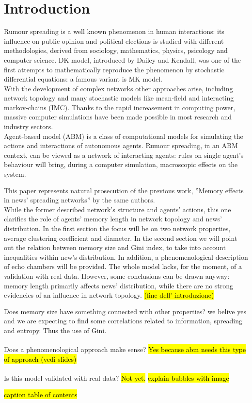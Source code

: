 \section{Introduction} \label{introduction}
Rumour spreading is a well known phenomenon in human interactions:
its influence on public opinion\cite{publicoprumsp} and political
elections\cite{politicalrumsp} is studied with different
methodologies, derived from sociology, mathematics,
physics, psicology and computer science.
DK model,\cite{DKmodel} introduced by Dailey and Kendall, was one of
the first attempts to mathematically reproduce the phenomenon by
stochastic differential equations: a famous variant is MK
model.\cite{MKmodel}\\
With the development of complex networks other approaches arise,
including network topology and many stochastic models
like mean-field\cite{meanfield} and interacting markov-chains\cite{IMC} (IMC).
Thanks to the rapid increasement in computing power,
massive computer simulations have been made possible in
most research and industry sectors.\\
Agent-based model (ABM) is a class of computational models for
simulating the actions and interactions of autonomous
agents.\cite{Agentbased}
Rumour spreading, in an ABM context, can be viewed as a network
of interacting agents: rules on single agent's behaviour
will bring, during a computer simulation, macroscopic
effects on the system.

This paper represents natural prosecution of the previous work,
''Memory effects in news' spreading networks'' by the same
authors.\cite{ourpaper}\\
While the former described network's structure and agents' actions,
this one clarifies the role of agents' memory length in network
topology and news' distribution. In the first section the focus
will be on two network properties, average clustering coefficient
and diameter. In the second section we will point out the relation
between memory size and Gini index, to take into account inequalities
within new's distribution.
In addition, a phenomenological description of echo chambers
will be provided.
The whole model lacks, for the moment, of a validation with real data.
However, some conclusions can be drawn anyway: memory length
primarily affects news' distribution, while there are no strong
evidencies of an influence in network topology.
\hl{(fine dell' introduzione)}


Does memory size have something connected with other properties?
we belive yes and we are expecting to find some correlations related
to information, spreading and entropy. Thus the use of Gini.\\ \\
Does a phenomenological approach make sense? \hl{Yes because abm needs
this type of approach (vedi slides)}\\ \\
Is this model validated with real data? \hl{Not yet.}
\hl{explain bubbles with image}

\hl{caption table of contents}